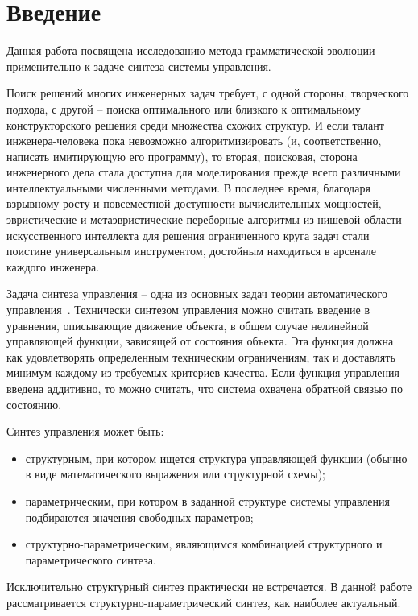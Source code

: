 \chapter*{Введение}

Данная работа посвящена исследованию метода грамматической эволюции применительно к задаче синтеза системы управления.

Поиск решений многих инженерных задач требует, с одной стороны, творческого подхода, с другой -- поиска оптимального или близкого к оптимальному конструкторского решения среди множества схожих структур.
И если талант инженера-человека пока невозможно алгоритмизировать (и, соответственно, написать имитирующую его программу), то вторая, поисковая, сторона инженерного дела стала доступна для моделирования прежде всего различными интеллектуальными численными методами.
В последнее время, благодаря взрывному росту и повсеместной доступности вычислительных мощностей, эвристические и метаэвристические переборные алгоритмы из нишевой области искусственного интеллекта для решения ограниченного круга задач стали поистине универсальным инструментом, достойным находиться в арсенале каждого инженера.

Задача синтеза управления -- одна из основных задач теории автоматического управления~\cite{Дивеев2011}.
Технически синтезом управления можно считать введение в уравнения, описывающие движение объекта, в общем случае нелинейной управляющей функции, зависящей от состояния объекта.
Эта функция должна как удовлетворять определенным техническим ограничениям, так и доставлять минимум каждому из требуемых критериев качества.
Если функция управления введена аддитивно, то можно считать, что система охвачена обратной связью по состоянию.

Синтез управления может быть:
\begin{itemize}
    \item структурным, при котором ищется структура управляющей функции (обычно в виде математического выражения или структурной схемы);
    \item параметрическим, при котором в заданной структуре системы управления подбираются значения свободных параметров;
    \item структурно-параметрическим, являющимся комбинацией структурного и параметрического синтеза.
\end{itemize}
Исключительно структурный синтез практически не встречается.
В данной работе рассматривается структурно-параметрический синтез, как наиболее актуальный.

